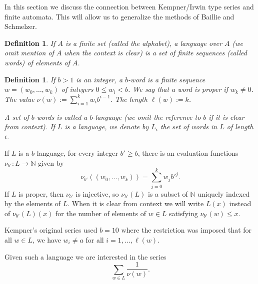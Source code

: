 \documentclass{article}
\newtheorem{definition}[section]{Definition}
\newcommand{\NN}{\mathbb{N}}
\begin{document}
In this section we discuss the connection between Kempner/Irwin type
series and finite automata. This will allow us to generalize the
methods of Baillie and Schmelzer.
\begin{definition}
  If $A$ is a finite set (called the \emph{alphabet}), a language over
  $A$ (we omit mention of $A$ when the context is clear) is a set
  of finite sequences (called \emph{words}) of elements of $A$.
\end{definition}
\begin{definition}
  If $b > 1$ is an integer, a \emph{$b$-word} is a finite sequence
  $w = (w_0, \dots, w_k)$ of integers $0 \le w_i < b$. We say that a
  word is \emph{proper} if $w_k \ne 0$.
  The \emph{value} $\nu(w) := \sum_{i=1}^k w_i b^{i-1}$. The \emph{length}
  $\ell(w) := k$.
  
  A set of $b$-words is called a \emph{$b$-language} (we omit the
  reference to $b$ if it is clear from context). If $L$ is a
  language, we denote by $L_i$ the set of words in $L$ of length $i$.
\end{definition}

If $L$ is a $b$-language, for every integer $b' \ge b$, there is an
evaluation functions $\nu_{b'} : L \rightarrow \NN$ given by
\begin{displaymath}
  \nu_{b'}((w_0,\dots,w_k)) = \sum_{j=0}^k w_j {b'}^j.
\end{displaymath}
If $L$ is proper, then $\nu_{b'}$ is injective, so $\nu_{b'}(L)$ is a
subset of $\NN$ uniquely indexed by the elements of $L$. When it is
clear from context we will write $L(x)$ instead of $\nu_{b'}(L)(x)$
for the number of elements of $w \in L$ satisfying $\nu_{b'}(w) \le
x$.

Kempner's original series used $b=10$ where the restriction was
imposed that for all $w \in L$, we have $w_i \ne a$ for all $i=1,
\dots, \ell(w)$.

Given such a language we are interested in the series
\begin{displaymath}
  \sum_{w \in L} \frac{1}{\nu(w)}.
\end{displaymath}
\end{document}
